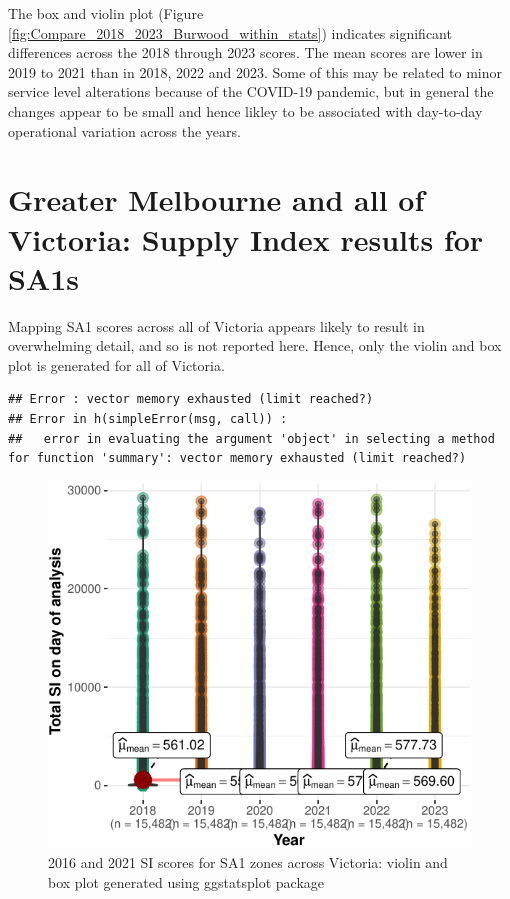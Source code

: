 \documentclass[]{tufte-book}
\begin{document}
The box and violin plot (Figure
\ref{fig:Compare_2018_2023_Burwood_within_stats}) indicates significant
differences across the 2018 through 2023 scores. The mean scores are
lower in 2019 to 2021 than in 2018, 2022 and 2023. Some of this may be
related to minor service level alterations because of the COVID-19
pandemic, but in general the changes appear to be small and hence likley
to be associated with day-to-day operational variation across the years.

\hypertarget{greater-melbourne-and-all-of-victoria-supply-index-results-for-sa1s}{%
\section{Greater Melbourne and all of Victoria: Supply Index results for
SA1s}\label{greater-melbourne-and-all-of-victoria-supply-index-results-for-sa1s}}

Mapping SA1 scores across all of Victoria appears likely to result in
overwhelming detail, and so is not reported here. Hence, only the violin
and box plot is generated for all of Victoria.

\begin{verbatim}
## Error : vector memory exhausted (limit reached?)
## Error in h(simpleError(msg, call)) : 
##   error in evaluating the argument 'object' in selecting a method for function 'summary': vector memory exhausted (limit reached?)
\end{verbatim}

\begin{figure}
\includegraphics{Reynolds_Currie_2024_transit_supply_index_GTFS_files/figure-latex/Compare_2018_2023_Victoria_within_stats-1} \caption[2016 and 2021 SI scores for SA1 zones across Victoria]{2016 and 2021 SI scores for SA1 zones across Victoria: violin and box plot generated using ggstatsplot package}\label{fig:Compare_2018_2023_Victoria_within_stats}
\end{figure}
\end{document}
